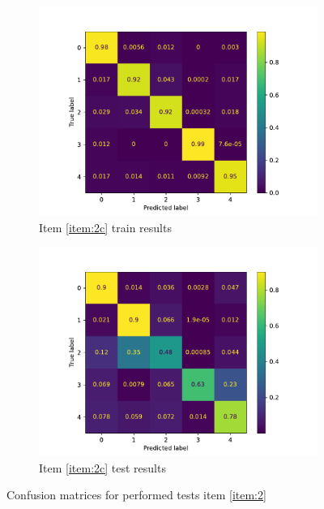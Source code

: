 \documentclass[10pt, a4paper]{article}
\begin{document}
\begin{figure}[htpb]
\begin{subfigure}[b]{0.47\textwidth}
    \includegraphics[width=\textwidth]{images/Patch128_scratch_cm_train.pdf}
    \caption{Item \ref{item:2c} train results}
    \label{fig:q2c_cm_train}
  \end{subfigure}
  \hfill
  \begin{subfigure}[b]{0.47\textwidth}
    \centering
    \includegraphics[width=\textwidth]{images/Patch128_scratch_cm_test.pdf}
    \caption{Item \ref{item:2c} test results}
    \label{fig:q2c_cm_test}
  \end{subfigure}
  \hfill
  \caption{Confusion matrices for performed tests item \ref{item:2}}
  \label{fig:q2_cm_results}
\end{figure}









\end{document}
